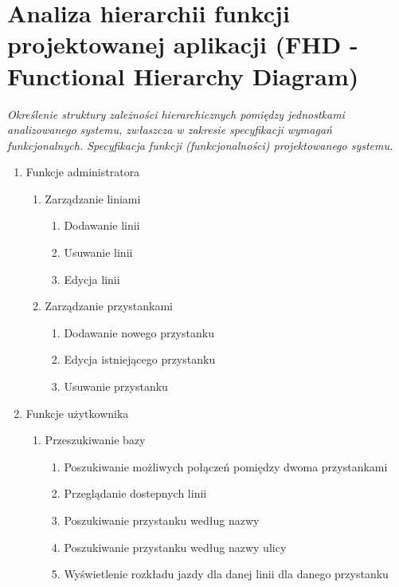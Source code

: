 \section{Analiza hierarchii funkcji projektowanej aplikacji (FHD - Functional Hierarchy
Diagram)}
\textit{Określenie struktury zależności hierarchicznych pomiędzy jednostkami
analizowanego systemu, zwłaszcza w zakresie specyfikacji wymagań funkcjonalnych.
Specyfikacja funkcji (funkcjonalności) projektowanego systemu.} \\

\begin{enumerate}
    \item Funkcje administratora
    \begin{enumerate}
        \item Zarządzanie liniami
                \begin{enumerate}
                    \item Dodawanie linii
                    \item Usuwanie linii
                    \item Edycja linii
                \end{enumerate}
        \item Zarządzanie przystankami
                \begin{enumerate}
                    \item Dodawanie nowego przystanku
                    \item Edycja istniejącego przystanku
                    \item Usuwanie przystanku
                \end{enumerate}
    \end{enumerate}

    \item Funkcje użytkownika
     \begin{enumerate}
        \item Przeszukiwanie bazy
            \begin{enumerate}
                \item Poszukiwanie możliwych połączeń pomiędzy dwoma przystankami
                \item Przeglądanie dostepnych linii
                \item Poszukiwanie przystanku według nazwy
                \item Poszukiwanie przystanku według nazwy ulicy
                \item Wyświetlenie rozkładu jazdy dla danej linii dla danego przystanku
            \end{enumerate}

     \end{enumerate}

\end{enumerate}




